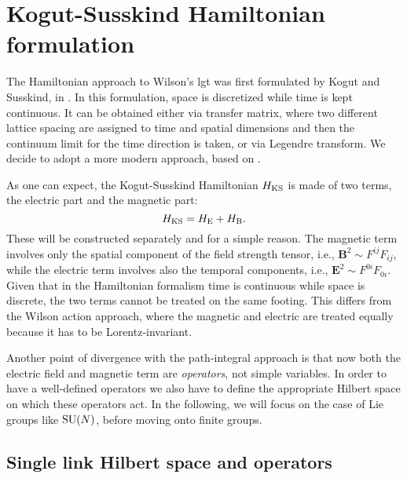 \section{Kogut-Susskind Hamiltonian formulation}
\label{sec:kogut_susskind_hamiltonian_formulation}

The Hamiltonian approach to Wilson's \ac{lgt} was first formulated by Kogut and Susskind, in \cite{kogut1975hamiltonian}.
In this formulation, space is discretized while time is kept continuous.
It can be obtained either via transfer matrix\citneeded, where two different lattice spacing are assigned to time and spatial dimensions and then the continuum limit for the time direction is taken, or via Legendre transform\citneeded.
We decide to adopt a more modern approach, based on \cite{milstead2018qyangmills,zohar2015latticegauge}.

As one can expect, the Kogut-Susskind Hamiltonian $H_{\text{KS}}$ is made of two terms, the electric part and the magnetic part:
\begin{equation}
    H_{\text{KS}} = H_{\text{E}} + H_{\text{B}}.
\end{equation}
These will be constructed separately and for a simple reason.
The magnetic term involves only the spatial component of the field strength tensor, i.e., $\mathbf{B}^{2} \sim F^{ij}F_{ij}$, while the electric term involves also the temporal components, i.e., $\mathbf{E}^2 \sim F^{0i} F_{0i}$.
Given that in the Hamiltonian formalism time is continuous while space is discrete, the two terms cannot be treated on the same footing.
This differs from the Wilson action approach, where the magnetic and electric are treated equally because it has to be Lorentz-invariant.

Another point of divergence with the path-integral approach is that now both the electric field and magnetic term are \emph{operators}, not simple variables.
In order to have a well-defined operators we also have to define the appropriate Hilbert space on which these operators act.
In the following, we will focus on the case of Lie groups like $\text{SU}(N)$, before moving onto finite groups.


%
%
\subsection{Single link Hilbert space and operators}
\label{sub:single_link_hilbert_space_and_operators}

